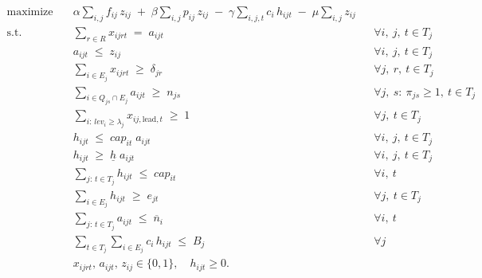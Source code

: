 \documentclass[11pt]{article}
\newcommand{\B}{\{0,1\}}
\DeclareMathOperator*{\maximize}{maximize}
\theoremstyle{remark}
\begin{document}
\begin{align}
\maximize \quad
  & \alpha \sum_{i,j} f_{ij}\, z_{ij}
  \;+\; \beta \sum_{i,j} p_{ij}\, z_{ij}
  \;-\; \gamma \sum_{i,j,t} c_i\, h_{ijt}
  \;-\; \mu \sum_{i,j} z_{ij}
  \label{eq:v2-obj} \\[4pt]
\text{s.t.}\quad
  & \sum_{r \in R} x_{ijrt} \;=\; a_{ijt}
  && \forall i,\ j,\ t \in T_j
  \label{eq:v2-onerole} \\
  & a_{ijt} \;\le\; z_{ij}
  && \forall i,\ j,\ t \in T_j
  \label{eq:v2-membership} \\
  & \sum_{i \in E_j} x_{ijrt} \;\ge\; \delta_{jr}
  && \forall j,\ r,\ t \in T_j
  \label{eq:v2-rolecover} \\
  & \sum_{i \in Q_{js} \cap E_j} a_{ijt} \;\ge\; n_{js}
  && \forall j,\ s:\ \pi_{js}\ge 1,\ t \in T_j
  \label{eq:v2-skillcover} \\
  & \sum_{i:\, \mathit{lev}_i \ge \lambda_j} x_{ij,\mathrm{lead},t} \;\ge\; 1
  && \forall j,\ t \in T_j
  \label{eq:v2-seniority} \\
  & h_{ijt} \;\le\; \mathit{cap}_{it}\; a_{ijt}
  && \forall i,\ j,\ t \in T_j
  \label{eq:v2-hours-ub} \\
  & h_{ijt} \;\ge\; \underline{h}\; a_{ijt}
  && \forall i,\ j,\ t \in T_j
  \label{eq:v2-hours-lb} \\
  & \sum_{j:\, t \in T_j} h_{ijt} \;\le\; \mathit{cap}_{it}
  && \forall i,\ t
  \label{eq:v2-capacity} \\
  & \sum_{i \in E_j} h_{ijt} \;\ge\; e_{jt}
  && \forall j,\ t \in T_j
  \label{eq:v2-effort} \\
  & \sum_{j:\, t \in T_j} a_{ijt} \;\le\; \overline{n}_i
  && \forall i,\ t
  \label{eq:v2-concurrency} \\
  & \sum_{t \in T_j} \sum_{i \in E_j} c_i\, h_{ijt} \;\le\; B_j
  && \forall j
  \label{eq:v2-budget} \\
  & x_{ijrt},\, a_{ijt},\, z_{ij} \in \B, \quad h_{ijt} \ge 0. \nonumber
\end{align}
\end{document}
